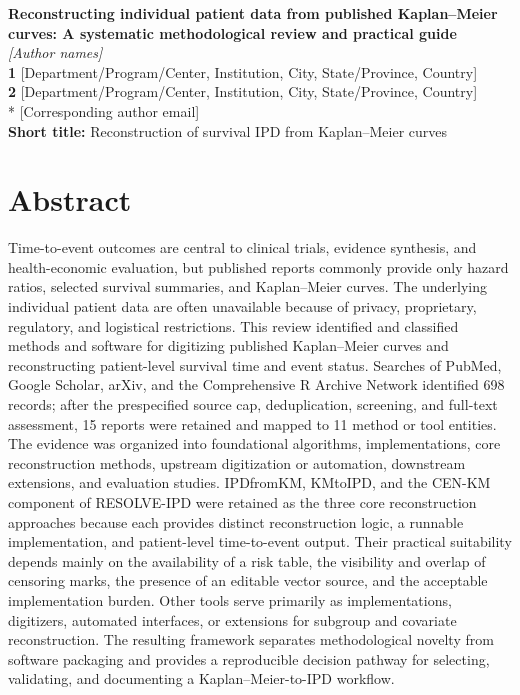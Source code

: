 \documentclass[12pt,letterpaper]{article}
\begin{document}
\vspace*{0.2in}
\begin{flushleft}
{\fontsize{15}{30}\selectfont\textbf{Reconstructing individual patient data from published Kaplan--Meier curves: A systematic methodological review and practical guide}}
\\[12pt]
\textit{[Author names]}\\[8pt]
\textbf{1} [Department/Program/Center, Institution, City, State/Province, Country]\\
\textbf{2} [Department/Program/Center, Institution, City, State/Province, Country]\\[8pt]
* [Corresponding author email]\\[12pt]
\textbf{Short title:} Reconstruction of survival IPD from Kaplan--Meier curves
\end{flushleft}
\clearpage
\section*{Abstract}

Time-to-event outcomes are central to clinical trials, evidence synthesis, and health-economic evaluation, but published reports commonly provide only hazard ratios, selected survival summaries, and Kaplan--Meier curves. The underlying individual patient data are often unavailable because of privacy, proprietary, regulatory, and logistical restrictions. This review identified and classified methods and software for digitizing published Kaplan--Meier curves and reconstructing patient-level survival time and event status. Searches of PubMed, Google Scholar, arXiv, and the Comprehensive R Archive Network identified 698 records; after the prespecified source cap, deduplication, screening, and full-text assessment, 15 reports were retained and mapped to 11 method or tool entities. The evidence was organized into foundational algorithms, implementations, core reconstruction methods, upstream digitization or automation, downstream extensions, and evaluation studies. IPDfromKM, KMtoIPD, and the CEN-KM component of RESOLVE-IPD were retained as the three core reconstruction approaches because each provides distinct reconstruction logic, a runnable implementation, and patient-level time-to-event output. Their practical suitability depends mainly on the availability of a risk table, the visibility and overlap of censoring marks, the presence of an editable vector source, and the acceptable implementation burden. Other tools serve primarily as implementations, digitizers, automated interfaces, or extensions for subgroup and covariate reconstruction. The resulting framework separates methodological novelty from software packaging and provides a reproducible decision pathway for selecting, validating, and documenting a Kaplan--Meier-to-IPD workflow.
\end{document}
